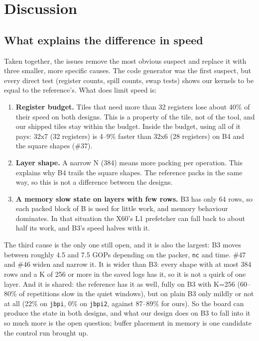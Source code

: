 \documentclass[11pt,a4paper]{article}
\begin{document}
\section{Discussion}

\subsection{What explains the difference in speed}
Taken together, the issues remove the most obvious suspect and replace it with three smaller, more specific
causes. The code generator was the first suspect, but every direct test (register counts, spill counts, swap tests)
shows our kernels to be equal to the reference's. What does limit speed is:
\begin{enumerate}
  \item \textbf{Register budget.} Tiles that need more than 32 registers lose about 40\% of their speed on both
  designs. This is a property of the tile, not of the tool, and our shipped tiles stay within the budget. Inside
  the budget, using all of it pays: 32x7 (32 registers) is 4--9\% faster than 32x6 (28 registers) on B4 and the
  square shapes (\#37).
  \item \textbf{Layer shape.} A narrow N (384) means more packing per operation. This explains why B4 trails the
  square shapes. The reference packs in the same way, so this is not a difference between the designs.
  \item \textbf{A memory slow state on layers with few rows.} B3 has only 64 rows, so each packed block of B is used
  for little work, and memory behaviour dominates. In that situation the X60's L1 prefetcher can fall back to
  about half its work, and B3's speed halves with it.
\end{enumerate}
The third cause is the only one still open, and it is also the largest: B3 moves between roughly 4.5 and 7.5
GOPs depending on the packer, \texttt{nc} and time. \#47 and \#46 widen and narrow it. It is wider than B3: every
shape with at most 384 rows and a K of 256 or more in the saved logs has it, so it is not a quirk of one layer. And
it is shared: the reference has it as well, fully on B3 with K=256 (60--80\% of repetitions slow in the quiet windows), but on plain B3
only mildly or not at all (22\% on \texttt{jbpi}, 0\% on \texttt{jbpi2}, against 87--89\% for ours). So the board can produce the state in both designs, and what our
design does on B3 to fall into it so much more is the open question; buffer placement in memory is one candidate the control run brought up.
\end{document}
